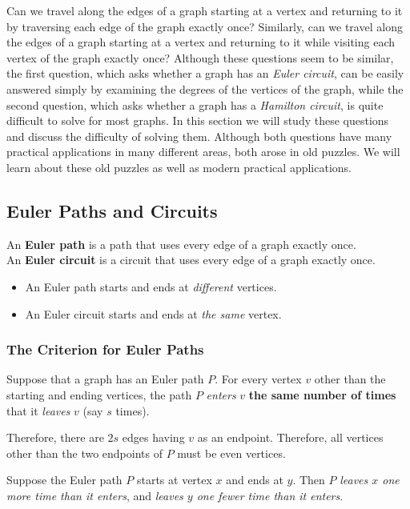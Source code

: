 \documentclass[11pt]{article}
\begin{document}
Can we travel along the edges of a graph starting at a vertex and returning to it by traversing each edge of the graph exactly once? Similarly, can we travel along the edges of a graph starting at a vertex and returning to it while visiting each vertex of the graph exactly once? Although these questions seem to be similar, the first question, which asks whether a graph has an \textit{Euler circuit}, can be easily answered simply by examining the degrees of the vertices of the graph, while the second question, which asks whether a graph has a \textit{Hamilton circuit}, is quite difficult to solve for most graphs. In this section we will study these questions and discuss the difficulty of solving them. Although both questions have many practical applications in many different areas, both arose in old puzzles. We will learn about these old puzzles as well as modern practical applications.

\subsection{Euler Paths and Circuits}

An \textbf{Euler path} is a path that uses every edge of a graph exactly once.\\
An \textbf{Euler circuit} is a circuit that uses every edge of a graph exactly 
once.
\begin{itemize}
    \item An Euler path starts and ends at \textit{different} vertices.
    \item An Euler circuit starts and ends at \textit{the same} vertex.
\end{itemize}

\subsubsection{The Criterion for Euler Paths}

Suppose that a graph has an Euler path $P$. For every vertex $v$ other than the starting and ending vertices, the path $P$ \textit{enters} $v$ \textbf{the same number of times} that it \textit{leaves} $v$ (say $s$ times).

Therefore, there are $2s$ edges having $v$ as an endpoint. Therefore, all vertices other than the two endpoints of $P$ must be even vertices.

Suppose the Euler path $P$ starts at vertex $x$ and ends at $y$. Then $P$ \textit{leaves $x$ one more time than it enters}, and \textit{leaves $y$
one fewer time than it enters}. 
\end{document}
